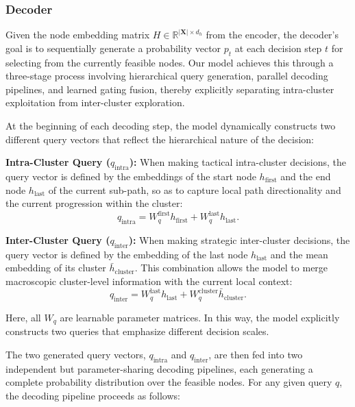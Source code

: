 \documentclass[pdflatex,sn-basic,Numbered]{sn-jnl}
\begin{document}
\subsubsection{Decoder}
Given the node embedding matrix $H \in \mathbb{R}^{|\mathbf{X}| \times d_h}$ from the encoder, the decoder's goal is to sequentially generate a probability vector $p_t$ at each decision step $t$ for selecting from the currently feasible nodes. Our model achieves this through a three-stage process involving hierarchical query generation, parallel decoding pipelines, and learned gating fusion, thereby explicitly separating intra-cluster exploitation from inter-cluster exploration.

At the beginning of each decoding step, the model dynamically constructs two different query vectors that reflect the hierarchical nature of the decision:

\textbf{Intra-Cluster Query ($q_{\text{intra}}$): }When making tactical intra-cluster decisions, the query vector is defined by the embeddings of the start node $h_{\text{first}}$ and the end node $h_{\text{last}}$ of the current sub-path, so as to capture local path directionality and the current progression within the cluster:
    \begin{equation}
        q_{\text{intra}} = W_q^{\text{first}}h_{\text{first}} + W_q^{\text{last}}h_{\text{last}}.
    \end{equation}

\textbf{Inter-Cluster Query ($q_{\text{inter}}$):} When making strategic inter-cluster decisions, the query vector is defined by the embedding of the last node $h_{\text{last}}$ and the mean embedding of its cluster $\bar{h}_{\text{cluster}}$. This combination allows the model to merge macroscopic cluster-level information with the current local context:
    \begin{equation}
        q_{\text{inter}} = W_q^{\text{last}}h_{\text{last}} + W_q^{\text{cluster}}\bar{h}_{\text{cluster}}.
    \end{equation}

Here, all $W_q$ are learnable parameter matrices. In this way, the model explicitly constructs two queries that emphasize different decision scales.

The two generated query vectors, $q_{\text{intra}}$ and $q_{\text{inter}}$, are then fed into two independent but parameter-sharing decoding pipelines, each generating a complete probability distribution over the feasible nodes. For any given query $q$, the decoding pipeline proceeds as follows:
\end{document}
